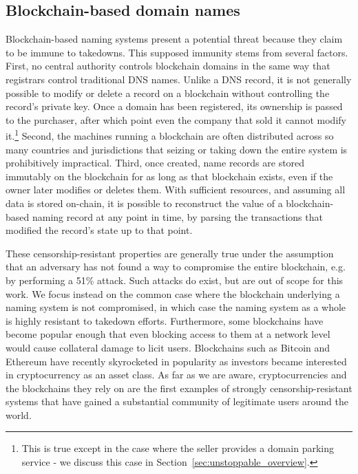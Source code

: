\subsection{Blockchain-based domain names}

Blockchain-based naming systems present a potential threat 
because they claim to be immune to takedowns. This supposed immunity stems 
from several factors. 
First, no central authority 
controls blockchain domains in the same way that registrars 
control traditional DNS names. Unlike a DNS record, it is not generally 
possible 
to modify or delete a record on a blockchain without controlling the record's 
private key. Once a domain has been registered, its ownership is passed to the 
purchaser, after which 
point even the company that 
sold it cannot modify it.\footnote{This is true except in the case where the 
seller provides a domain parking service - we discuss this case in 	
Section~\ref{sec:unstoppable_overview}.}
Second, the machines running a blockchain are often distributed across so many 
countries and jurisdictions that seizing or taking down the entire system is 
prohibitively impractical. 
Third, once created, name records are stored immutably on the 
blockchain for as long as that blockchain exists, even if the owner later 
modifies or deletes them. With sufficient resources, and assuming all data is 
stored on-chain, it is possible to reconstruct the value of a 
blockchain-based naming record at any point in time, by parsing the 
transactions that modified the record's state up to that point.

These censorship-resistant properties are generally true under the assumption 
that an adversary has not found a way to compromise the entire blockchain, e.g. 
by performing a 51\% attack. Such 
attacks do exist, but are out of scope for this work. We focus instead on the 
common case where the blockchain underlying a naming system is not compromised, 
in which case the naming system as a whole is highly resistant to takedown 
efforts. Furthermore, some blockchains have become popular enough that even 
blocking access to them at a network level would cause collateral damage to 
licit users. Blockchains such as Bitcoin and Ethereum have recently 
skyrocketed in popularity as investors became interested in cryptocurrency as 
an asset class. As far as we are aware, cryptocurrencies and the blockchains 
they rely on are the first examples of strongly censorship-resistant systems 
that have gained a substantial community of legitimate users around the world.

